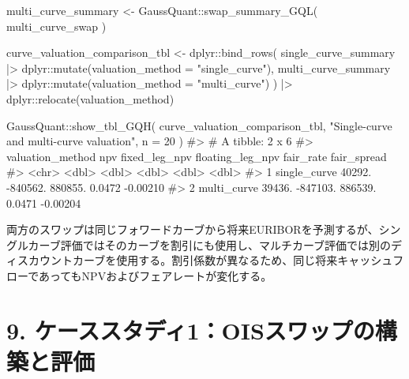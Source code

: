 \documentclass[
  letterpaper,
  DIV=11,
  numbers=noendperiod]{scrreprt}
\newenvironment{Shaded}{\begin{snugshade}}{\end{snugshade}}
\newcommand{\AttributeTok}[1]{\textcolor[rgb]{0.40,0.45,0.13}{#1}}
\newcommand{\CommentTok}[1]{\textcolor[rgb]{0.37,0.37,0.37}{#1}}
\newcommand{\DecValTok}[1]{\textcolor[rgb]{0.68,0.00,0.00}{#1}}
\newcommand{\FunctionTok}[1]{\textcolor[rgb]{0.28,0.35,0.67}{#1}}
\newcommand{\NormalTok}[1]{\textcolor[rgb]{0.00,0.23,0.31}{#1}}
\newcommand{\OtherTok}[1]{\textcolor[rgb]{0.00,0.23,0.31}{#1}}
\newcommand{\SpecialCharTok}[1]{\textcolor[rgb]{0.37,0.37,0.37}{#1}}
\newcommand{\StringTok}[1]{\textcolor[rgb]{0.13,0.47,0.30}{#1}}
\begin{document}
\begin{Shaded}
\begin{Highlighting}[]
\NormalTok{multi\_curve\_summary }\OtherTok{\textless{}{-}}\NormalTok{ GaussQuant}\SpecialCharTok{::}\FunctionTok{swap\_summary\_GQL}\NormalTok{(}
\NormalTok{  multi\_curve\_swap}
\NormalTok{)}

\NormalTok{curve\_valuation\_comparison\_tbl }\OtherTok{\textless{}{-}}\NormalTok{ dplyr}\SpecialCharTok{::}\FunctionTok{bind\_rows}\NormalTok{(}
\NormalTok{  single\_curve\_summary }\SpecialCharTok{|\textgreater{}}
\NormalTok{    dplyr}\SpecialCharTok{::}\FunctionTok{mutate}\NormalTok{(}\AttributeTok{valuation\_method =} \StringTok{"single\_curve"}\NormalTok{),}
\NormalTok{  multi\_curve\_summary }\SpecialCharTok{|\textgreater{}}
\NormalTok{    dplyr}\SpecialCharTok{::}\FunctionTok{mutate}\NormalTok{(}\AttributeTok{valuation\_method =} \StringTok{"multi\_curve"}\NormalTok{)}
\NormalTok{) }\SpecialCharTok{|\textgreater{}}
\NormalTok{  dplyr}\SpecialCharTok{::}\FunctionTok{relocate}\NormalTok{(valuation\_method)}

\NormalTok{GaussQuant}\SpecialCharTok{::}\FunctionTok{show\_tbl\_GQH}\NormalTok{(}
\NormalTok{  curve\_valuation\_comparison\_tbl,}
  \StringTok{"Single{-}curve and multi{-}curve valuation"}\NormalTok{,}
  \AttributeTok{n =} \DecValTok{20}
\NormalTok{)}
\CommentTok{\#\textgreater{} \# A tibble: 2 x 6}
\CommentTok{\#\textgreater{}   valuation\_method    npv fixed\_leg\_npv floating\_leg\_npv fair\_rate fair\_spread}
\CommentTok{\#\textgreater{}   \textless{}chr\textgreater{}             \textless{}dbl\textgreater{}         \textless{}dbl\textgreater{}            \textless{}dbl\textgreater{}     \textless{}dbl\textgreater{}       \textless{}dbl\textgreater{}}
\CommentTok{\#\textgreater{} 1 single\_curve     40292.      {-}840562.          880855.    0.0472    {-}0.00210}
\CommentTok{\#\textgreater{} 2 multi\_curve      39436.      {-}847103.          886539.    0.0471    {-}0.00204}
\end{Highlighting}
\end{Shaded}

両方のスワップは同じフォワードカーブから将来EURIBORを予測するが、シングルカーブ評価ではそのカーブを割引にも使用し、マルチカーブ評価では別のディスカウントカーブを使用する。割引係数が異なるため、同じ将来キャッシュフローであってもNPVおよびフェアレートが変化する。

\section{9.
ケーススタディ1：OISスワップの構築と評価}\label{ux30b1ux30fcux30b9ux30b9ux30bfux30c7ux30a31oisux30b9ux30efux30c3ux30d7ux306eux69cbux7bc9ux3068ux8a55ux4fa1}
\end{document}
